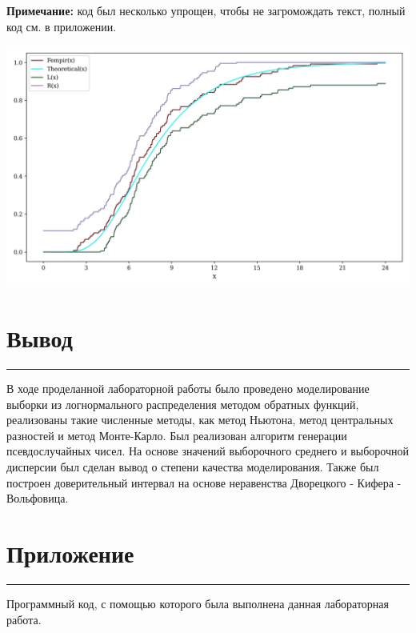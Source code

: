 \documentclass[a4paper, 14pt]{extarticle}
\begin{document}
{\footnotesize \textbf{Примечание:} код был несколько упрощен, чтобы не загромождать текст, 
полный код см. в приложении.}

\vfill

\includegraphics[width=1\textwidth]{Dvoretzky-Kiefer-Wolfowitz}

\vfill

\newpage

\section{Вывод}\vspace{-20pt}\rule{\linewidth}{0.1mm}

В ходе проделанной лабораторной работы было проведено моделирование выборки из 
логнормального распределения методом обратных функций, реализованы такие численные 
методы, как метод Ньютона, метод центральных разностей и метод Монте-Карло. Был реализован 
алгоритм генерации псевдослучайных чисел. На основе значений выборочного среднего и 
выборочной дисперсии был сделан вывод о степени качества моделирования. Также был 
построен доверительный интервал на основе неравенства Дворецкого - Кифера - Вольфовица.


\newpage

\section{Приложение}\vspace{-20pt}\rule{\linewidth}{0.1mm}

Программный код, с помощью которого была выполнена данная лабораторная работа.\\
\end{document}

